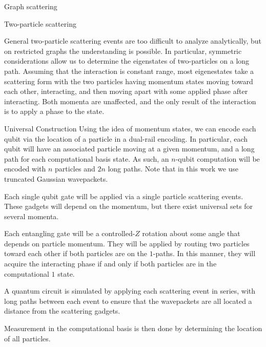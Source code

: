 \documentclass{beamer}
\newlength{\onecolwid}
\begin{document}
\begin{frame}[t]
\begin{columns}[t]
\begin{column}{\onecolwid}
\begin{block}{Graph scattering}
  \end{block}

  \begin{block}{Two-particle scattering}

	General two-particle scattering events are too difficult to analyze analytically, but on restricted graphs the understanding is possible.  In particular, symmetric considerations allow us to determine the eigenstates of two-particles on a long path.  Assuming that the interaction is constant range, most eigenestates take a scattering form with the two particles having momentum states moving toward each other, interacting, and then moving apart with some applied phase after interacting.  Both momenta are unaffected, and the only result of the interaction is to apply a phase to the state.   

  \end{block}

  \begin{block}{Universal Construction}
    Using the idea of momentum states, we can encode each qubit via the location of a particle in a dual-rail encoding.  In particular, each qubit will have an associated particle moving at a given momentum, and a long path for each computational basis state.  As such, an $n$-qubit computation will be encoded with $n$ particles and $2n$ long paths.  Note that in this work we use truncated Gaussian wavepackets.
    
    Each single qubit gate will be applied via a single particle scattering events.  These gadgets will depend on the momentum, but there exist universal sets for several momenta.
    
    Each entangling gate will be a controlled-$Z$ rotation about some angle that depends on particle momentum.  They will be applied by routing two particles toward each other if both particles are on the $1$-paths.  In this manner, they will acquire the interacting phase if and only if both particles are in the computational $1$ state.
    
	A quantum circuit is simulated by applying each scattering event in series, with long paths between each event to ensure that the wavepackets are all located a distance from the scattering gadgets.
    
    Measurement in the computational basis is then done by determining the location of all particles.


\end{block}
\end{column}
\end{columns}
\end{frame}
\end{document}
